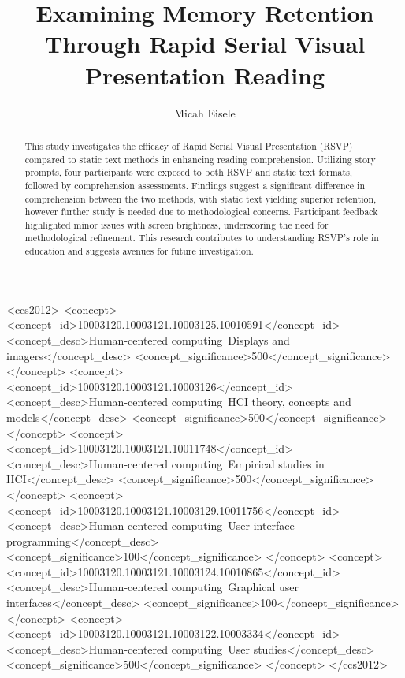 \documentclass[manuscript,screen]{acmart}
\begin{document}
\title{Examining Memory Retention Through Rapid Serial Visual Presentation Reading}

\author{Micah Eisele}

\renewcommand{\shortauthors}{Eisele}

\begin{abstract}
  This study investigates the efficacy of Rapid Serial Visual Presentation (RSVP) compared to static text methods in enhancing reading comprehension. Utilizing story prompts, four participants were exposed to both RSVP and static text formats, followed by comprehension assessments. Findings suggest a significant difference in comprehension between the two methods, with static text yielding superior retention, however further study is needed due to methodological concerns. Participant feedback highlighted minor issues with screen brightness, underscoring the need for methodological refinement. This research contributes to understanding RSVP's role in education and suggests avenues for future investigation.
\end{abstract}


\begin{CCSXML}
<ccs2012>
   <concept>
       <concept_id>10003120.10003121.10003125.10010591</concept_id>
       <concept_desc>Human-centered computing~Displays and imagers</concept_desc>
       <concept_significance>500</concept_significance>
       </concept>
   <concept>
       <concept_id>10003120.10003121.10003126</concept_id>
       <concept_desc>Human-centered computing~HCI theory, concepts and models</concept_desc>
       <concept_significance>500</concept_significance>
       </concept>
   <concept>
       <concept_id>10003120.10003121.10011748</concept_id>
       <concept_desc>Human-centered computing~Empirical studies in HCI</concept_desc>
       <concept_significance>500</concept_significance>
       </concept>
   <concept>
       <concept_id>10003120.10003121.10003129.10011756</concept_id>
       <concept_desc>Human-centered computing~User interface programming</concept_desc>
       <concept_significance>100</concept_significance>
       </concept>
   <concept>
       <concept_id>10003120.10003121.10003124.10010865</concept_id>
       <concept_desc>Human-centered computing~Graphical user interfaces</concept_desc>
       <concept_significance>100</concept_significance>
       </concept>
   <concept>
       <concept_id>10003120.10003121.10003122.10003334</concept_id>
       <concept_desc>Human-centered computing~User studies</concept_desc>
       <concept_significance>500</concept_significance>
       </concept>
 </ccs2012>
\end{CCSXML}
\end{document}
